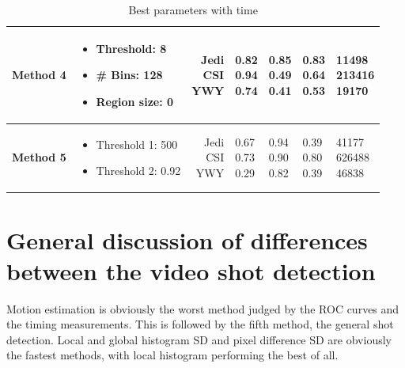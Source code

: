 \documentclass[a4paper,10pt]{article}
\begin{document}
\begin{table}
\begin{tabular}{|l|l|r||l|l|l|l|}
    	\textbf{Method 4}   & \parbox{30mm}{\begin{itemize}\item Threshold: 8\item \# Bins: 128\item Region size: 0\end{itemize}}            & \parbox{10mm}{Jedi \\ CSI \\ YWY}  &  \parbox{10mm}{0.82\\ 0.94\\ 0.74} & \parbox{10mm}{0.85\\ 0.49\\ 0.41} & \parbox{10mm}{0.83\\ 0.64\\ 0.53} & \parbox{20mm}{11498\\ 213416\\ 19170} \\ \hline
    	
    	\textbf{Method 5}       & \parbox{30mm}{\begin{itemize}\item Threshold 1: 500 \item Threshold 2: 0.92\end{itemize}}                   & \parbox{10mm}{Jedi \\ CSI \\ YWY}  &  \parbox{10mm}{0.67\\ 0.73\\ 0.29} & \parbox{10mm}{0.94\\ 0.90\\ 0.82} & \parbox{10mm}{0.39\\ 0.80\\ 0.39} & \parbox{20mm}{41177\\ 626488\\ 46838} \\ \hline
    \end{tabular}
    \caption{Best parameters with time}
    \label{bestparams}
\end{table}

\section{General discussion of differences between the video shot detection}
Motion estimation is obviously the worst method judged by the ROC curves and the timing measurements. This is followed by the fifth method, the general shot detection. Local and global histogram SD and pixel difference SD are obviously the fastest methods, with local histogram performing the best of all.
\end{document}
